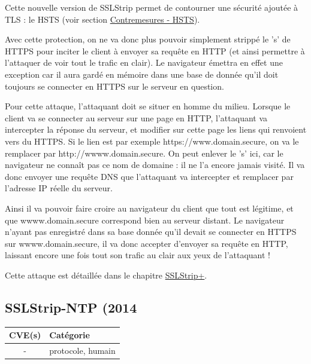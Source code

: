 \vspace{1em}

Cette nouvelle version de SSLStrip permet de contourner une sécurité ajoutée à TLS : le HSTS (voir section \hyperref[sec:hsts]{Contremesures - HSTS}).

Avec cette protection, on ne va donc plus pouvoir simplement strippé le 's' de HTTPS pour inciter le client à envoyer sa requête en HTTP (et ainsi permettre à l'attaquer de voir tout le trafic en clair). Le navigateur émettra en effet une exception car il aura gardé en mémoire dans une base de donnée qu'il doit toujours se connecter en HTTPS sur le serveur en question.

Pour cette attaque, l'attaquant doit se situer en homme du milieu. Lorsque le client va se connecter au serveur sur une page en HTTP, l'attaquant va intercepter la réponse du serveur, et modifier sur cette page les liens qui renvoient vers du HTTPS. Si le lien est par exemple https://www.domain.secure, on va le remplacer par http://wwww.domain.secure. On peut enlever le 's' ici, car le navigateur ne connaît pas ce nom de domaine : il ne l'a encore jamais visité. Il va donc envoyer une requête DNS que l'attaquant va intercepter et remplacer par l'adresse IP réelle du serveur.

Ainsi il va pouvoir faire croire au navigateur du client que tout est légitime, et que wwww.domain.secure correspond bien au serveur distant. Le navigateur n'ayant pas enregistré dans sa base donnée qu'il devait se connecter en HTTPS sur wwww.domain.secure, il va donc accepter d'envoyer sa requête en HTTP, laissant encore une fois tout son trafic au clair aux yeux de l'attaquant !

Cette attaque est détaillée dans le chapitre \hyperref[sec:sslstrip2]{SSLStrip+}.


\subsection{SSLStrip-NTP (2014}

\begin{tabularx}{0.96\textwidth}{|c|X|}
  \hline
  \textbf{CVE(s)} & \textbf{Catégorie} \\
  \hline
  - & protocole, humain \\
  \hline
\end{tabularx}

